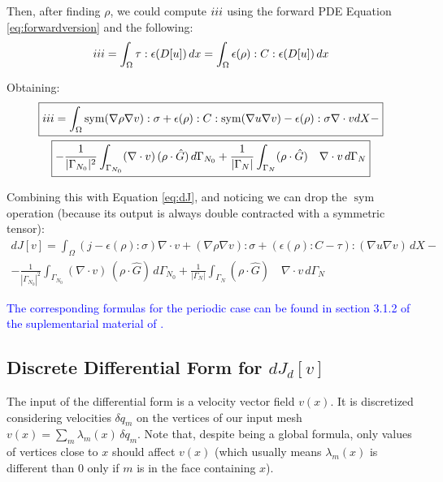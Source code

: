 \documentclass[11pt]{article}
\DeclareMathOperator{\sym}{sym}
\newcommand{\RNum}[1]{\uppercase\expandafter{\romannumeral #1\relax}}
\newcommand{\blue}{\textcolor{blue}}
\begin{document}
Then, after finding $\rho$, we could compute $\RNum{3}$ using the forward PDE Equation \ref{eq:forwardversion} and the following:
\begin{align*}
  \RNum{3} = \int_\Omega \tau:\epsilon(D[u])\, dx = \int_\Omega \epsilon(\rho):C:\epsilon(D[u]) \, dx
\end{align*}

Obtaining:
\begin{multline}
  \boxed{\RNum{3} =
  \int_{\Omega} \sym(\nabla \rho \nabla v):\sigma + \epsilon(\rho):C:\sym(\nabla u \nabla v) - \epsilon(\rho): \sigma \nabla \cdot v  dX -} \\ \boxed{- \frac{1}{|\Gamma_{N_0}|^2} \int_{\Gamma_{N_0}} (\nabla \cdot v)\, (\rho \cdot \hat G)\, d\Gamma_{N_0} + \frac{1}{|\Gamma_N|}\int_{\Gamma_{N}} (\rho \cdot \hat G) \quad \nabla \cdot v\, d\Gamma_{N}}
  \label{eq:IIIcomputation}
\end{multline}

Combining this with Equation \ref{eq:dJ}, and noticing we can drop the $\sym$ operation (because its output is always double contracted with a symmetric tensor):
\begin{multline}
  \boxed{dJ[v] = \int_{\Omega} (j - \epsilon(\rho): \sigma)\nabla \cdot v + (\nabla \rho \nabla v):\sigma + (\epsilon(\rho):C - \tau) : (\nabla u \nabla v) \, dX -} \\ \boxed{- \frac{1}{|\Gamma_{N_0}|^2} \int_{\Gamma_{N_0}} (\nabla \cdot v)\, (\rho \cdot \hat G)\, d\Gamma_{N_0} + \frac{1}{|\Gamma_N|}\int_{\Gamma_{N}} (\rho \cdot \hat G) \quad \nabla \cdot v\, d\Gamma_{N}}
  \label{eq:completedJ}
\end{multline}

\blue{The corresponding formulas for the periodic case can be found in section 3.1.2 of the suplementarial material of \cite{panetta2017}.}

\subsection{Discrete Differential Form for $dJ_d[v]$}

The input of the differential form is a velocity vector field $v(x)$. It is discretized considering velocities $\delta q_m$ on the vertices of our input mesh $v(x) = \sum_m \lambda_m(x) \, \delta q_m$. Note that, despite being a global formula, only values of vertices close to $x$ should affect $v(x)$ (which usually means $\lambda_m(x)$ is different than $0$ only if $m$ is in the face containing $x$).
\end{document}
